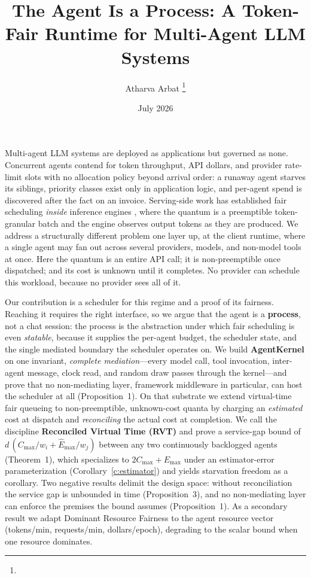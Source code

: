 \documentclass[letterpaper,11pt,leqno]{article}
\begin{document}
\title{The Agent Is a Process: A Token-Fair Runtime for Multi-Agent LLM Systems}

\author{Atharva Arbat
\thanks{}}

\date{July 2026}


\begin{titlepage}
\maketitle

Multi-agent LLM systems are deployed as applications but governed as none. Concurrent agents contend for token throughput, API dollars, and provider rate-limit slots with no allocation policy beyond arrival order: a runaway agent starves its siblings, priority classes exist only in application logic, and per-agent spend is discovered after the fact on an invoice. Serving-side work has established fair scheduling \emph{inside} inference engines \citep{Sheng24}, where the quantum is a preemptible token-granular batch and the engine observes output tokens as they are produced. We address a structurally different problem one layer up, at the client runtime, where a single agent may fan out across several providers, models, and non-model tools at once. Here the quantum is an entire API call; it is non-preemptible once dispatched; and its cost is unknown until it completes. No provider can schedule this workload, because no provider sees all of it.

Our contribution is a scheduler for this regime and a proof of its fairness. Reaching it requires the right interface, so we argue that the agent is a \textbf{process}, not a chat session: the process is the abstraction under which fair scheduling is even \emph{statable}, because it supplies the per-agent budget, the scheduler state, and the single mediated boundary the scheduler operates on. We build \textbf{AgentKernel} on one invariant, \emph{complete mediation}---every model call, tool invocation, inter-agent message, clock read, and random draw passes through the kernel---and prove that no non-mediating layer, framework middleware in particular, can host the scheduler at all (Proposition~1). On that substrate we extend virtual-time fair queueing to non-preemptible, unknown-cost quanta by charging an \emph{estimated} cost at dispatch and \emph{reconciling} the actual cost at completion. We call the discipline \textbf{Reconciled Virtual Time (RVT)} and prove a service-gap bound of $d\,(C_{\max}/w_i + \hat{E}_{\max}/w_j)$ between any two continuously backlogged agents (Theorem~1), which specializes to $2C_{\max} + E_{\max}$ under an estimator-error parameterization (Corollary~\ref{c:estimator}) and yields starvation freedom as a corollary. Two negative results delimit the design space: without reconciliation the service gap is unbounded in time (Proposition~3), and no non-mediating layer can enforce the premises the bound assumes (Proposition~1). As a secondary result we adapt Dominant Resource Fairness \citep{Ghodsi11} to the agent resource vector (tokens/min, requests/min, dollars/epoch), degrading to the scalar bound when one resource dominates.


\end{titlepage}
\end{document}
